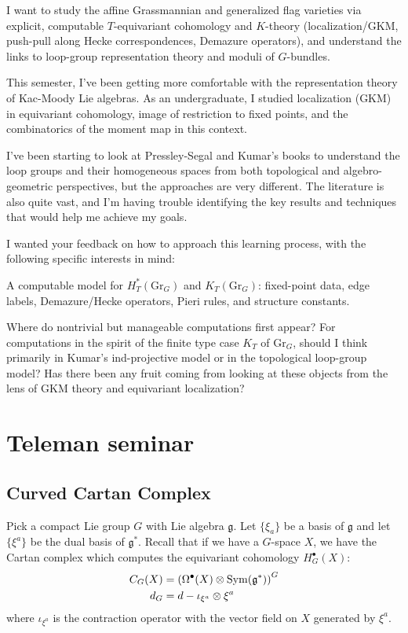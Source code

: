 \documentclass[12pt]{article}
\begin{document}
I want to study the affine Grassmannian and generalized flag varieties via explicit, computable $T$-equivariant cohomology and $K$-theory (localization/GKM, push-pull along Hecke correspondences, Demazure operators), and understand the links to loop-group representation theory and moduli of $G$-bundles.

This semester, I've been getting more comfortable with the representation theory of Kac-Moody Lie algebras. As an undergraduate, I studied localization (GKM) in equivariant cohomology, image of restriction to fixed points, and the combinatorics of the moment map in this context.

I've been starting to look at Pressley-Segal and Kumar's books to understand the loop groups and their homogeneous spaces from both topological and algebro-geometric perspectives, but the approaches are very different. The literature is also quite vast, and I'm having trouble identifying the key results and techniques that would help me achieve my goals.

I wanted your feedback on how to approach this learning process, with the following specific interests in mind:

A computable model for $H_T^*(\mathrm{Gr}_G)$ and $K_T(\mathrm{Gr}_G)$: fixed-point data, edge labels, Demazure/Hecke operators, Pieri rules, and structure constants.

Where do nontrivial but manageable computations first appear? For computations in the spirit of the finite type case $K_T$ of $\mathrm{Gr}_G$, should I think primarily in Kumar's ind-projective model or in the topological loop-group model? Has there been any fruit coming from looking at these objects from the lens of GKM theory and equivariant localization?

\section{Teleman seminar}
\subsection{Curved Cartan Complex}
Pick a compact Lie group $G$ with Lie algebra $\mathfrak g$. Let $\{\xi_a\}$ be a basis of $\mathfrak g$ and let $\{\xi^a\}$ be the dual basis of $\mathfrak g^*$. Recall that if we have a $G$-space $X$, we have the Cartan complex which computes the equivariant cohomology $H_G^\bullet(X)$:
\begin{align*}
    C_G(X) &= \left( \Omega^\bullet(X) \otimes \operatorname{Sym}(\mathfrak g^*) \right)^G \\
    d_G &= d - \iota_{\xi^a} \otimes \xi^a
\end{align*} where $\iota_{\xi^a}$ is the contraction operator with the vector field on $X$ generated by $\xi^a$. 
\end{document}
